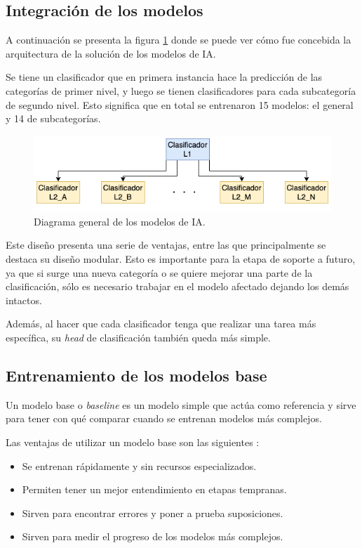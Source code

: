 \subsection{Integración de los modelos}

A continuación se presenta la figura \ref{fig:cap3-redes} donde se puede ver cómo fue concebida la arquitectura de la solución de los modelos de IA.

Se tiene un clasificador que en primera instancia hace la predicción de las categorías de primer nivel, y luego se tienen clasificadores para cada subcategoría de segundo nivel. Esto significa que en total se entrenaron 15 modelos: el general y 14 de subcategorías.

\begin{figure}[htbp]
	\centering
	\includegraphics[width=.8\textwidth]{./Figures/cap3-redes.png}
	\caption{Diagrama general de los modelos de IA.}
	\label{fig:cap3-redes}
\end{figure}

Este diseño presenta una serie de ventajas, entre las que principalmente se destaca su diseño modular. Esto es importante para la etapa de soporte a futuro, ya que si surge una nueva categoría o se quiere mejorar una parte de la clasificación, sólo es necesario trabajar en el modelo afectado dejando los demás intactos.

Además, al hacer que cada clasificador tenga que realizar una tarea más específica, su \textit{head} de clasificación también queda más simple.

\subsection{Entrenamiento de los modelos base}

Un modelo base o \textit{baseline} es un modelo simple que actúa como referencia y sirve para tener con qué comparar cuando se entrenan modelos más complejos. 

Las ventajas de utilizar un modelo base son las siguientes \citep{WEBSITE:23}:
\begin{itemize}
	\item Se entrenan rápidamente y sin recursos especializados.
	\item Permiten tener un mejor entendimiento en etapas tempranas.
	\item Sirven para encontrar errores y poner a prueba suposiciones.
	\item Sirven para medir el progreso de los modelos más complejos.
\end{itemize}

